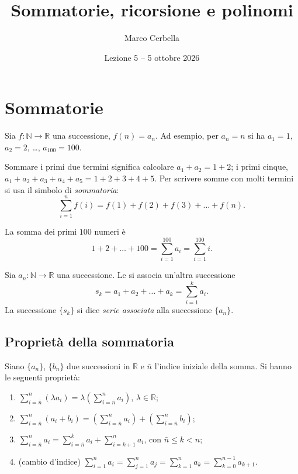 \documentclass[11pt,a4paper]{article}
\title{Sommatorie, ricorsione e polinomi}
\author{Marco Cerbella}
\date{Lezione 5 -- 5 ottobre 2026}
\begin{document}
\maketitle

\section{Sommatorie}

Sia $f \colon \mathbb{N} \to \mathbb{R}$ una successione, $f(n) = a_n$. Ad
esempio, per $a_n = n$ si ha $a_1 = 1$, $a_2 = 2$, \dots, $a_{100} = 100$.

Sommare i primi due termini significa calcolare $a_1 + a_2 = 1 + 2$; i primi
cinque, $a_1 + a_2 + a_3 + a_4 + a_5 = 1 + 2 + 3 + 4 + 5$. Per scrivere somme
con molti termini si usa il simbolo di \emph{sommatoria}:
\[
\sum_{i=1}^{n} f(i) = f(1) + f(2) + f(3) + \dots + f(n).
\]

\begin{esempio}
La somma dei primi $100$ numeri è
\[
1 + 2 + \dots + 100 = \sum_{i=1}^{100} a_i = \sum_{i=1}^{100} i .
\]
\end{esempio}

\begin{definizione}
Sia $a_n \colon \mathbb{N} \to \mathbb{R}$ una successione. Le si associa
un'altra successione
\[
s_k = a_1 + a_2 + \dots + a_k = \sum_{i=1}^{k} a_i .
\]
La successione $\{s_k\}$ si dice \emph{serie associata} alla successione
$\{a_n\}$.
\end{definizione}

\subsection{Proprietà della sommatoria}

\begin{proposizione}
Siano $\{a_n\}$, $\{b_n\}$ due successioni in $\mathbb{R}$ e $\bar n$ l'indice
iniziale della somma. Si hanno le seguenti proprietà:
\begin{enumerate}
    \item $\displaystyle \sum_{i=\bar n}^{n} (\lambda a_i)
          = \lambda \left( \sum_{i=\bar n}^{n} a_i \right)$, \quad
          $\lambda \in \mathbb{R}$;
    \item $\displaystyle \sum_{i=\bar n}^{n} (a_i + b_i)
          = \left( \sum_{i=\bar n}^{n} a_i \right)
          + \left( \sum_{i=\bar n}^{n} b_i \right)$;
    \item $\displaystyle \sum_{i=\bar n}^{n} a_i
          = \sum_{i=\bar n}^{k} a_i + \sum_{i=k+1}^{n} a_i$, \quad
          con $\bar n \leq k < n$;
    \item (cambio d'indice)
          $\displaystyle \sum_{i=1}^{n} a_i = \sum_{j=1}^{n} a_j
          = \sum_{k=1}^{n} a_k = \sum_{k=0}^{n-1} a_{k+1}$.
\end{enumerate}
\end{proposizione}
\end{document}
